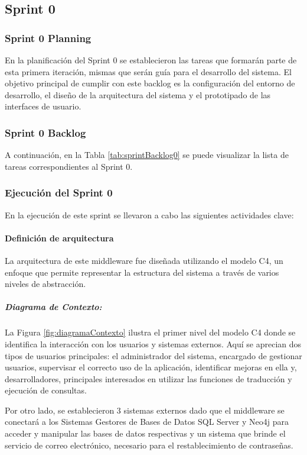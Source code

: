 \subsection{Sprint 0}
\subsubsection{Sprint 0 Planning}
En la planificación del Sprint 0 se establecieron las tareas que formarán parte de esta primera iteración, mismas que serán guía para el desarrollo del sistema. El objetivo principal de cumplir con este backlog es la configuración del entorno de desarrollo, el diseño de la arquitectura del sistema y el prototipado de las interfaces de usuario.

\subsubsection{Sprint 0 Backlog}
A continuación, en la Tabla \ref{tab:sprintBacklog0} se puede visualizar la lista de tareas correspondientes al Sprint 0.




\subsubsection{Ejecución del Sprint 0}
En la ejecución de este sprint se llevaron a cabo las siguientes actividades clave:
\paragraph{Definición de arquitectura}
La arquitectura de este middleware fue diseñada utilizando el modelo C4, un enfoque que permite representar la estructura del sistema a través de varios niveles de abstracción.

\subparagraph{Diagrama de Contexto:}
La Figura \ref{fig:diagramaContexto} ilustra el primer nivel del modelo C4 donde se identifica la interacción con los usuarios y sistemas externos. Aquí se aprecian dos tipos de usuarios principales: el administrador del sistema, encargado de gestionar usuarios, supervisar el correcto uso de la aplicación, identificar mejoras en ella y, desarrolladores, principales interesados en utilizar las funciones de traducción y ejecución de consultas.
 
Por otro lado, se establecieron 3 sistemas externos dado que el middleware se conectará a los Sistemas Gestores de Bases de Datos SQL Server y Neo4j para acceder y manipular las bases de datos respectivas y un sistema que brinde el servicio de correo electrónico, necesario para el restablecimiento de contraseñas.

